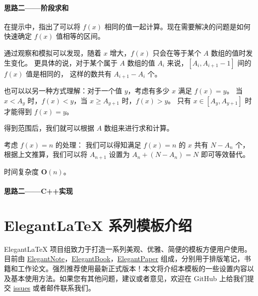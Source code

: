 \documentclass[cn,10pt,math=newtx,citestyle=gb7714-2015,bibstyle=gb7714-2015]{elegantbook}
\begin{document}
\subsubsection{思路二——阶段求和}

在提示中，指出了可以将 $f(x)$ 相同的值一起计算。现在需要解决的问题是如何快速确定 $f(x)$ 值相等的区间。

通过观察和模拟可以发现，随着 $x$ 增大，$f(x)$ 只会在等于某个 $A$ 数组的值时发生变化。
更具体的说，对于某个属于 $A$ 数组的值 $A_i$ 来说，$[A_i,A_{i+1}-1]$ 间的 $f(x)$ 值是相同的，
这样的数共有 $A_{i+1}-A_i$ 个。

也可以以另一种方式理解：对于一个值 $y$，考虑有多少 $x$ 满足 $f(x)=y$。
当 $x<A_y$ 时，$f(x)<y$，当 $x\ge A_{y+1}$ 时，$f(x)>y$。
只有 $x\in [A_y,A_{y+1}]$ 时才能得到 $f(x)=y$。

得到范围后，我们就可以根据 $A$ 数组来进行求和计算。

考虑 $f(x)=n$ 的处理：
我们可以得知满足 $f(x)=n$ 的 $x$ 共有 $N-A_n$ 个，
根据上文推算，我们可以将 $A_{n+1}$ 设置为 $A_n+(N-A_n)=N$ 即可等效替代。

时间复杂度 $\mathbf{O}(n)$。

\subsubsection{思路二——C++实现}



\chapter{Elegant\LaTeX{} 系列模板介绍}

Elegant\LaTeX{} 项目组致力于打造一系列美观、优雅、简便的模板方便用户使用。目前由 \href{https://github.com/ElegantLaTeX/ElegantNote}{ElegantNote}，\href{https://github.com/ElegantLaTeX/ElegantBook}{ElegantBook}，\href{https://github.com/ElegantLaTeX/ElegantPaper}{ElegantPaper} 组成，分别用于排版笔记，书籍和工作论文。强烈推荐使用最新正式版本！本文将介绍本模板的一些设置内容以及基本使用方法。如果您有其他问题，建议或者意见，欢迎在 GitHub 上给我们提交 \href{https://github.com/ElegantLaTeX/ElegantBook/issues}{issues} 或者邮件联系我们。
\end{document}
